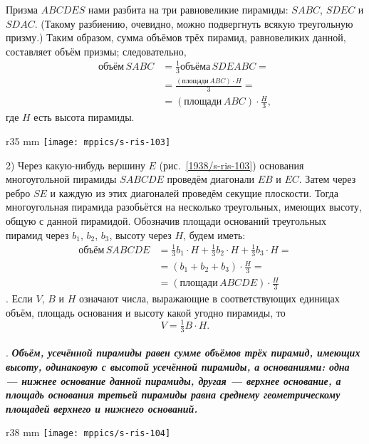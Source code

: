 Призма $ABCDES$ нами разбита на три равновеликие пирамиды: $SABC$, $SDEC$ и $SDAC$.
(Такому разбиению, очевидно, можно подвергнуть всякую треугольную призму.) Таким образом, сумма объёмов трёх пирамид, равновеликих данной, составляет объём призмы;
следовательно,
\begin{align*}
\text{объём}\,SABC &= \tfrac13 \text{объёма}\, SDEABC =
\\
&=\frac{(\text{площади}\,ABC)\cdot H}3=
\\
&=(\text{площади}\,ABC)\cdot \frac{H}3,
\end{align*}
где $H$ есть высота пирамиды.

\begin{wrapfigure}{r}{35 mm}
\vskip-8mm
\centering
\texttt{[image: mppics/s-ris-103]}
\caption{}\label{1938/s-ris-103}
\vskip-0mm
\end{wrapfigure}

2) Через какую-нибудь вершину $E$ (рис.~\ref{1938/s-ris-103}) основания многоугольной пирамиды $SABCDE$ проведём диагонали $EB$ и $EC$.
Затем через ребро $SE$ и каждую из этих диагоналей проведём секущие плоскости.
Тогда многоугольная пирамида разобьётся на несколько треугольных, имеющих высоту, общую с данной пирамидой.
Обозначив площади оснований треугольных пирамид через $b_1$, $b_2$, $b_3$, высоту через $H$, будем иметь:
\begin{align*}
\text{объём}\,SABCDE &= \tfrac13b_1\cdot H + \tfrac13b_2\cdot H + \tfrac13b_3 \cdot H =
\\
&=(b_1+b_2+b_3)\cdot \frac H3=
\\
&=(\text{площади}\,ABCDE)\cdot \frac H3
\end{align*}
.
Если $V$, $B$ и $H$ означают числа, выражающие в соответствующих единицах объём, площадь основания и высоту какой угодно пирамиды, то
\[V = \tfrac13 B\cdot H.\]

\paragraph{}\label{1938/s92}
.
\textbf{\emph{Объём, усечённой пирамиды равен сумме объёмов трёх пирамид, имеющих высоту, одинаковую с высотой усечённой пирамиды, а основаниями: одна — нижнее основание данной пирамиды, другая — верхнее основание, а площадь основания третьей пирамиды равна среднему геометрическому площадей верхнего и нижнего оснований.}}

\begin{wrapfigure}{r}{38 mm}
\vskip-0mm
\centering
\texttt{[image: mppics/s-ris-104]}
\caption{}\label{1938/s-ris-104}
\vskip-0mm
\end{wrapfigure}

